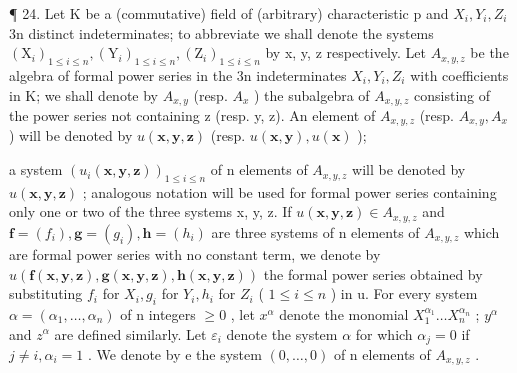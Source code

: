 ¶ 24. Let K be a (commutative) field of (arbitrary) characteristic p and \(X_{i}, Y_{i}, Z_{i}\) 3n distinct indeterminates; to abbreviate we shall denote the systems \((\mathrm{X}_{i})_{1 \leq i \leq n}, (\mathrm{Y}_{i})_{1 \leq i \leq n}, (\mathrm{Z}_{i})_{1 \leq i \leq n}\) by x, y, z respectively. Let \(A_{x,y,z}\) be the algebra of formal power series in the 3n indeterminates \(X_{i}, Y_{i}, Z_{i}\) with coefficients in K; we shall denote by \(A_{x,y}\) (resp. \(A_{x}\) ) the subalgebra of \(A_{x,y,z}\) consisting of the power series not containing z (resp. y, z). An element of \(A_{x,y,z}\) (resp. \(A_{x,y}, A_{x}\) ) will be denoted by \(u(\mathbf{x}, \mathbf{y}, \mathbf{z})\) (resp. \(u(\mathbf{x}, \mathbf{y}), u(\mathbf{x})\) );

 a system \((u_{i}(\mathbf{x},\mathbf{y},\mathbf{z}))_{1\leqslant i\leqslant n}\) of n elements of \(A_{x,y,z}\) will be denoted by \(u(\mathbf{x},\mathbf{y},\mathbf{z})\) ; analogous notation will be used for formal power series containing only one or two of the three systems x, y, z. If \(u(\mathbf{x},\mathbf{y},\mathbf{z})\in A_{x,y,z}\) and \(\mathbf{f}=(f_{i}),\mathbf{g}=(g_{i}),\mathbf{h}=(h_{i})\) are three systems of n elements of \(A_{x,y,z}\) which are formal power series with no constant term, we denote by \(u(\mathbf{f}(\mathbf{x},\mathbf{y},\mathbf{z}),\mathbf{g}(\mathbf{x},\mathbf{y},\mathbf{z}),\mathbf{h}(\mathbf{x},\mathbf{y},\mathbf{z}))\) the formal power series obtained by substituting \(f_{i}\) for \(X_{i}, g_{i}\) for \(Y_{i}, h_{i}\) for \(Z_{i}\) ( \(1\leqslant i\leqslant n\) ) in u. For every system \(\alpha=(\alpha_{1},\ldots,\alpha_{n})\) of n integers \(\geqslant0\) , let \(x^{\alpha}\) denote the monomial \(X_{1}^{\alpha_{1}}\ldots X_{n}^{\alpha_{n}}\) ; \(y^{\alpha}\) and \(z^{\alpha}\) are defined similarly. Let \(\varepsilon_{i}\) denote the system \(\alpha\) for which \(\alpha_{j}=0\) if \(j\neq i, \alpha_{i}=1\) . We denote by e the system \((0,\ldots,0)\) of n elements of \(A_{x,y,z}\) .

